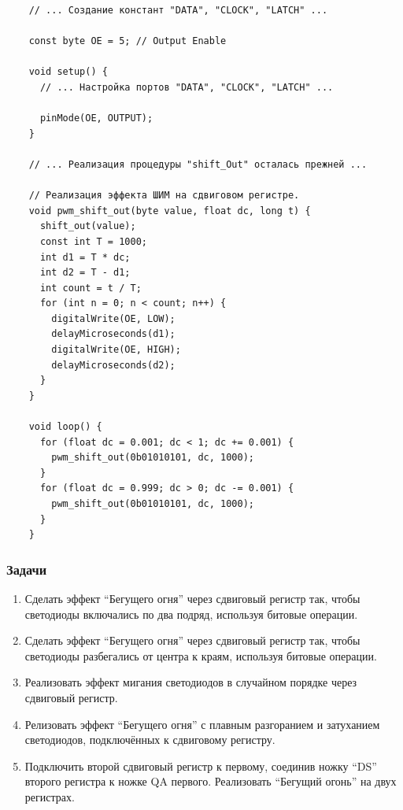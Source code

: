 \documentclass[../sparc.tex]{subfiles}
\begin{document}
\begin{listing}[H]
  \begin{verbatim}
    // ... Создание констант "DATA", "CLOCK", "LATCH" ...

    const byte OE = 5; // Output Enable

    void setup() {
      // ... Настройка портов "DATA", "CLOCK", "LATCH" ...

      pinMode(OE, OUTPUT);
    }

    // ... Реализация процедуры "shift_Out" осталась прежней ...

    // Реализация эффекта ШИМ на сдвиговом регистре.
    void pwm_shift_out(byte value, float dc, long t) {
      shift_out(value);
      const int T = 1000;
      int d1 = T * dc;
      int d2 = T - d1;
      int count = t / T;
      for (int n = 0; n < count; n++) {
        digitalWrite(OE, LOW);
        delayMicroseconds(d1);
        digitalWrite(OE, HIGH);
        delayMicroseconds(d2);
      }
    }

    void loop() {
      for (float dc = 0.001; dc < 1; dc += 0.001) {
        pwm_shift_out(0b01010101, dc, 1000);
      }
      for (float dc = 0.999; dc > 0; dc -= 0.001) {
        pwm_shift_out(0b01010101, dc, 1000);
      }
    }
  \end{verbatim}
  \label{listing:communication-sipo-pwm}
  \caption{Реализация эффекта широтно-импульсной модуляции на сдвиговом
    регистре.}
\end{listing}

\subsubsection{Задачи}

\begin{enumerate}
\item Сделать эффект ``Бегущего огня'' через сдвиговый регистр так, чтобы
  светодиоды включались по два подряд, используя битовые операции.
\item Сделать эффект ``Бегущего огня'' через сдвиговый регистр так, чтобы
  светодиоды разбегались от центра к краям, используя битовые операции.
\item Реализовать эффект мигания светодиодов в случайном порядке через сдвиговый
  регистр.
\item Релизовать эффект ``Бегущего огня'' с плавным разгоранием и затуханием
  светодиодов, подключённых к сдвиговому регистру.
\item Подключить второй сдвиговый регистр к первому, соединив ножку ``DS''
  второго регистра к ножке QA первого.  Реализовать ``Бегущий огонь'' на двух
  регистрах.
\end{enumerate}
\end{document}
